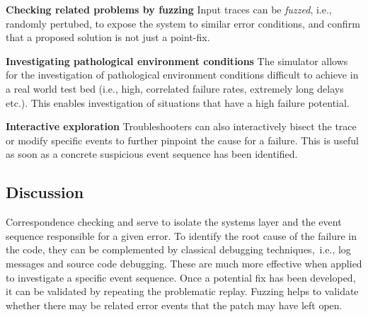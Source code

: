 \textbf{Checking related problems by fuzzing} Input traces can be \emph{fuzzed}, i.e.,
randomly pertubed, to expose the system to similar error conditions, and confirm
that a proposed solution is not just a point-fix.

\textbf{Investigating pathological environment conditions} The simulator allows for the investigation
of pathological environment conditions difficult to achieve in a real world test bed
(i.e., high, correlated failure rates, extremely long delays etc.). This enables
investigation of situations that have a high failure potential.

\textbf{Interactive exploration} Troubleshooters can also interactively bisect
the trace or modify specific events to further pinpoint the cause for a failure.
This is useful as soon as a concrete suspicious event sequence has been identified.

\subsection{Discussion}
Correspondence checking and \simulator{} serve to isolate the systems layer and
the event sequence responsible for a given error. To identify the root cause of
the failure in the code, they can be complemented by classical debugging
techniques,~i.e., log messages and source code debugging. These are much more
effective when applied to investigate a specific event sequence. Once a
potential fix has been developed, it can be validated by repeating the
problematic replay. Fuzzing helps to validate whether there may be
related error events that the patch may have left open.



